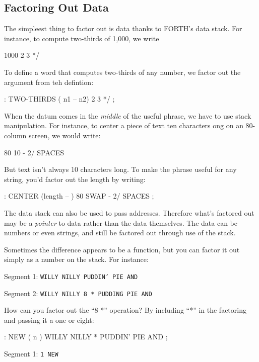 \subsection{{Factoring Out Data}}
The simpleest thing to factor out is data thanks to FORTH's data stack. For instance, to compute two-thirds of 1,000, we write

\begin{Code}
1000 2 3 */
\end{Code}
To define a word that computes two-thirds of any number, we factor out the argument from teh defintion:

\begin{Code}
: TWO-THIRDS  ( n1 -- n2)  2 3 */ ;
\end{Code}
When the datum comes in the \emph{middle} of the useful phrase, we have to use stack manipulation. For instance, to center a piece of text ten characters ong on an 80-column screen, we would write:

\begin{Code}
80  10 -  2/ SPACES
\end{Code}
But text isn't always 10 characters long. To make the phrase useful for any string, you'd factor out the length by writing:

\begin{Code}
: CENTER (length -- ) 80 SWAP - 2/ SPACES ;
\end{Code}
The data stack can also be used to pass addresses. Therefore what's factored out may be a \emph{pointer} to data rather than the data themselves. The data can be numbers or even strings, and still be factored out through use of the stack.
	
Sometimes the difference appears to be a function, but you can factor it out simply as a number on the stack. For instance:

\bigskip

Segment 1:	\texttt{WILLY NILLY  PUDDIN' PIE AND}

Segment 2:	\texttt{WILLY NILLY  8 * PUDDING PIE AND}

\bigskip

\noindent
How can you factor out the ``8 *'' operation? By including ``*'' in the factoring and passing it a one or eight:

\begin{Code}
: NEW  ( n )  WILLY NILLY * PUDDIN' PIE AND ;
\end{Code}

Segment 1:    \texttt{1 NEW}

